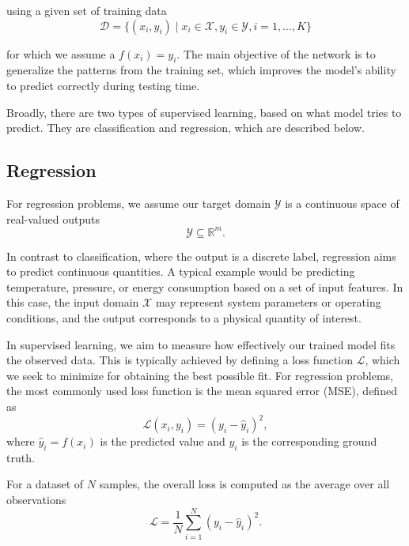 using a given set of training data
\begin{equation}
\mathcal{D} = \{(x_i, y_i) \mid x_i \in \mathcal{X}, y_i \in \mathcal{Y}, i = 1, \dots, K \}
\end{equation}

for which we assume a $f(x_i) = y_i$. The main objective of the network is to generalize the patterns from the training set, which improves the model’s ability to predict correctly during testing time.

Broadly, there are two types of supervised learning, based on what model tries to predict. They are classification and regression, which are described below.

\subsection{Regression}

For regression problems, we assume our target domain $\mathcal{Y}$ is a continuous space of real-valued outputs
\begin{equation}
\mathcal{Y} \subseteq \mathbb{R}^m.
\end{equation}

In contrast to classification, where the output is a discrete label, regression aims to predict continuous quantities. A typical example would be predicting temperature, pressure, or energy consumption based on a set of input features. In this case, the input domain $\mathcal{X}$ may represent system parameters or operating conditions, and the output corresponds to a physical quantity of interest.

In supervised learning, we aim to measure how effectively our trained model fits the observed data. This is typically achieved by defining a loss function $\mathcal{L}$, which we seek to minimize for obtaining the best possible fit. For regression problems, the most commonly used loss function is the mean squared error (MSE), defined as
\begin{equation}
\mathcal{L}(x_i, y_i) = (y_i - \hat{y}_i)^2,
\end{equation}
where $\hat{y}_i = f(x_i)$ is the predicted value and $y_i$ is the corresponding ground truth.

For a dataset of $N$ samples, the overall loss is computed as the average over all observations
\begin{equation}
\mathcal{L} = \frac{1}{N} \sum_{i=1}^{N} (y_i - \hat{y}_i)^2.
\end{equation}


